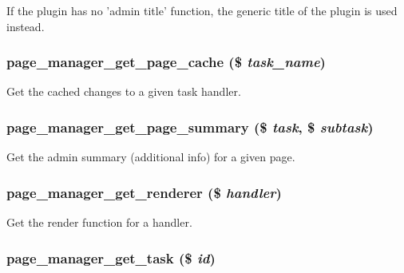 If the plugin has no 'admin title' function, the generic title of the plugin is used instead. \hypertarget{page__manager_8module_a37bf1f336f11680f111b980f1f06f7bb}{
\subsubsection[{page\_\-manager\_\-get\_\-page\_\-cache}]{\setlength{\rightskip}{0pt plus 5cm}page\_\-manager\_\-get\_\-page\_\-cache (\$ {\em task\_\-name})}}
\label{page__manager_8module_a37bf1f336f11680f111b980f1f06f7bb}
Get the cached changes to a given task handler. \hypertarget{page__manager_8module_ab0eca887f694137c6e9091bd0fbbf6cb}{
\subsubsection[{page\_\-manager\_\-get\_\-page\_\-summary}]{\setlength{\rightskip}{0pt plus 5cm}page\_\-manager\_\-get\_\-page\_\-summary (\$ {\em task}, \/  \$ {\em subtask})}}
\label{page__manager_8module_ab0eca887f694137c6e9091bd0fbbf6cb}
Get the admin summary (additional info) for a given page. \hypertarget{page__manager_8module_a48c0f73f866b9c31d400c04b23b8445e}{
\subsubsection[{page\_\-manager\_\-get\_\-renderer}]{\setlength{\rightskip}{0pt plus 5cm}page\_\-manager\_\-get\_\-renderer (\$ {\em handler})}}
\label{page__manager_8module_a48c0f73f866b9c31d400c04b23b8445e}
Get the render function for a handler. \hypertarget{page__manager_8module_a402f17e89478e21a1d0f4b128996e764}{
\subsubsection[{page\_\-manager\_\-get\_\-task}]{\setlength{\rightskip}{0pt plus 5cm}page\_\-manager\_\-get\_\-task (\$ {\em id})}}
